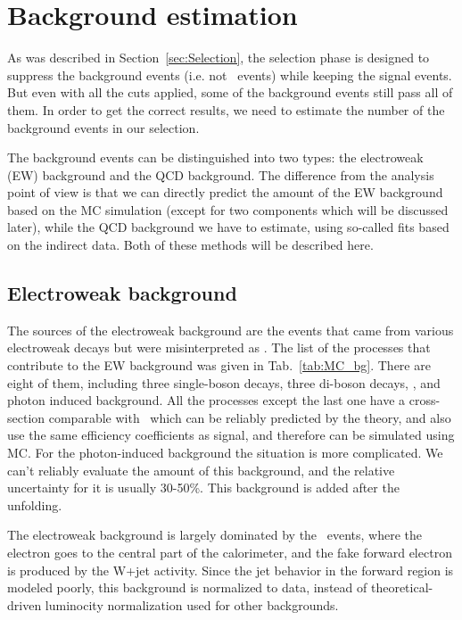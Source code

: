 \chapter{Background estimation}
\label{sec:Bkg}

As was described in Section~\ref{sec:Selection}, the selection phase is designed to suppress the background events (i.e. not \Zee\ events) while keeping the signal events. But even with all the cuts applied, some of the background events still pass all of them. In order to get the correct results, we need to estimate the number of the background events in our selection.

The background events can be distinguished into two types: the electroweak (EW) background and the QCD background. The difference from the analysis point of view is that we can directly predict the amount of the EW background based on the MC simulation (except for two components which will be discussed later), while the QCD background we have to estimate, using so-called fits based on the indirect data. Both of these methods will be described here.

\section{Electroweak background}

The sources of the electroweak background are the events that came from various electroweak decays but were misinterpreted as \Zee. The list of the processes that contribute to the EW background was given in Tab.~\ref{tab:MC_bg}. There are eight of them, including three single-boson decays, three di-boson decays, \ttbar, and photon induced background. All the processes except the last one have a cross-section comparable with \Zee\ which can be reliably predicted by the theory, and also use the same efficiency coefficients as signal, and therefore can be simulated using MC. For the photon-induced background the situation is more complicated. We can't reliably evaluate the amount of this background, and the relative uncertainty for it is usually 30-50\%. This background is added after the unfolding.

The electroweak background is largely dominated by the \Wenu\ events, where the electron goes to the central part of the calorimeter, and the fake forward electron is produced by the W+jet activity. Since the jet behavior in the forward region is modeled poorly, this background is normalized to data, instead of theoretical-driven luminocity normalization used for other backgrounds.

